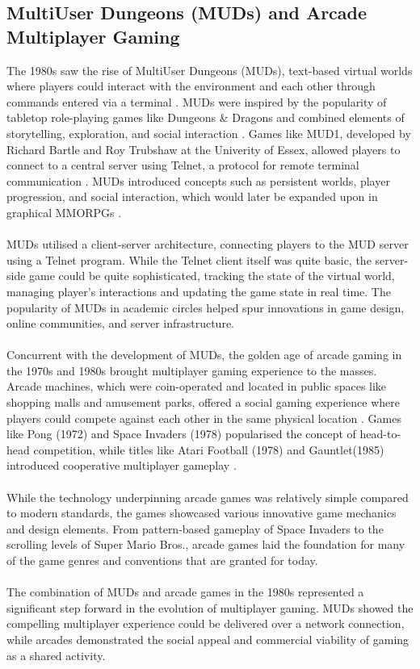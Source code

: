 \subsection{MultiUser Dungeons (MUDs) and Arcade Multiplayer Gaming}
The 1980s saw the rise of MultiUser Dungeons (MUDs), text-based virtual worlds where players could interact with the environment and each other through commands entered via a terminal \cite{bartle1990}. MUDs were inspired by the popularity of tabletop role-playing games like Dungeons \& Dragons and combined elements of storytelling, exploration, and social interaction \cite{Doom}. Games like MUD1, developed by Richard Bartle and Roy Trubshaw at the Univerity of Essex, allowed players to connect to a central server using Telnet, a protocol for remote terminal communication \cite{arm2006networking}. MUDs introduced concepts such as persistent worlds, player progression, and social interaction, which would later be expanded upon in graphical MMORPGs \cite{bartle2004designing}.
\\
\noindent
\\
MUDs utilised a client-server architecture, connecting players to the MUD server using a Telnet program. While the Telnet client itself was quite basic, the server-side game could be quite sophisticated, tracking the state of the virtual world, managing player's interactions and updating the game state in real time. The popularity of MUDs in academic circles helped spur innovations in game design, online communities, and server infrastructure.
\\
\noindent
\\
Concurrent with the development of MUDs, the golden age of arcade gaming in the 1970s and 1980s brought multiplayer gaming experience to the masses. Arcade machines, which were coin-operated and located in public spaces like shopping malls and amusement parks, offered a social gaming experience where players could compete against each other in the same physical location \cite{donovan2010replay}. Games like Pong (1972) and Space Invaders (1978) popularised the concept of head-to-head competition, while titles like Atari Football (1978) and Gauntlet(1985) introduced cooperative multiplayer gameplay \cite{arm2006networking}.
\\
\noindent
\\
While the technology underpinning arcade games was relatively simple compared to modern standards, the games showcased various innovative game mechanics and design elements. From pattern-based gameplay of Space Invaders to the scrolling levels of Super Mario Bros., arcade games laid the foundation for many of the game genres and conventions that are granted for today.
\\
\noindent
\\
The combination of MUDs and arcade games in the 1980s represented a significant step forward in the evolution of multiplayer gaming. MUDs showed the compelling multiplayer experience could be delivered over a network connection, while arcades demonstrated the social appeal and commercial viability of gaming as a shared activity.

